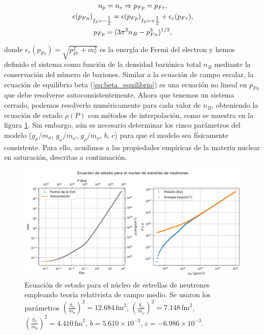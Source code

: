 \begin{gather}
	n_p = n_e \Rightarrow p_{Fp} = p_{Fe}, \\
	\epsilon(p_{Fn})_{I_3=-\tfrac{1}{2}} = \epsilon(p_{Fp})_{I_3=+\tfrac{1}{2}} + \epsilon_e(p_{Fe}), \label{eq:beta_equilibrio} \\
	p_{Fp} = (3\pi^2n_B - p_{Fn}^3)^{1/3},
\end{gather}

donde $\epsilon_e(p_{Fe}) = \sqrt{p_{Fe}^2 + m_e^2}$ es la energía de Fermi del electron y hemos definido el sistema como función de la densidad bariónica total $n_B$ mediante la conservación del número de bariones. Similar a la ecuación de campo escalar, la ecuación de equilibrio beta (\ref{eq:beta_equilibrio}) es una ecuación no lineal en $p_{Fn}$ que debe resolverse autoconsistentemente. Ahora que tenemos un sistema cerrado, podemos resolverlo numéricamente para cada valor de $n_B$, obteniendo la ecuación de estado $\rho(P)$ con métodos de interpolación, como se muestra en la figura \ref{fig:materiaestelarbase}. Sin embargo, aún es necesario determinar los cinco parámetros del modelo ($g_\sigma/m_\sigma$, $g_\omega/m_\omega$, $g_\rho/m_\rho$, $b$, $c$) para que el modelo sea físicamente consistente. Para ello, acudimos a las propiedades empíricas de la materia nuclear en saturación, descritas a continuación.

\begin{figure}[h]
	\centering
	\includegraphics[width=0.95\linewidth]{Figuras/materia_estelar_base}
	\caption[Ecuación de estado para el núcleo de estrellas de neutrones.]{Ecuación de estado para el núcleo de estrellas de neutrones empleando teoría relativista de campo medio. Se usaron los parámetros $\left(\frac{g_\sigma}{m_\sigma}\right)^2=12.684\,\text{fm}^2$, $\left(\frac{g_\omega}{m_\omega}\right)^2=7.148\,\text{fm}^2$, $\left(\frac{g_\rho}{m_\rho}\right)^2=4.410\,\text{fm}^2$, $b=5.610\times10^{-3}$, $c=-6.986\times10^{-3}$.}
	\label{fig:materiaestelarbase}
\end{figure}


